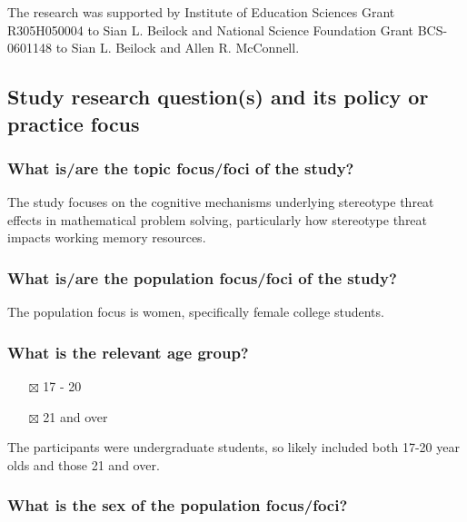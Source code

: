 \documentclass[
  doc, a4paper]{apa7}
\providecommand{\tightlist}{%
  \setlength{\itemsep}{0pt}\setlength{\parskip}{0pt}}
\begin{document}
The research was supported by Institute of Education Sciences Grant R305H050004 to Sian L. Beilock and National Science Foundation Grant BCS-0601148 to Sian L. Beilock and Allen R. McConnell.

\subsection{Study research question(s) and its policy or practice focus}\label{study-research-questions-and-its-policy-or-practice-focus}

\subsubsection{What is/are the topic focus/foci of the study?}\label{what-isare-the-topic-focusfoci-of-the-study}

The study focuses on the cognitive mechanisms underlying stereotype threat effects in mathematical problem solving, particularly how stereotype threat impacts working memory resources.

\subsubsection{What is/are the population focus/foci of the study?}\label{what-isare-the-population-focusfoci-of-the-study}

The population focus is women, specifically female college students.

\subsubsection{What is the relevant age group?}\label{what-is-the-relevant-age-group}

\begin{itemize}
\tightlist
\item[$\boxtimes$]
  17 - 20\\
\item[$\boxtimes$]
  21 and over
\end{itemize}

The participants were undergraduate students, so likely included both 17-20 year olds and those 21 and over.

\subsubsection{What is the sex of the population focus/foci?}\label{what-is-the-sex-of-the-population-focusfoci}
\end{document}
